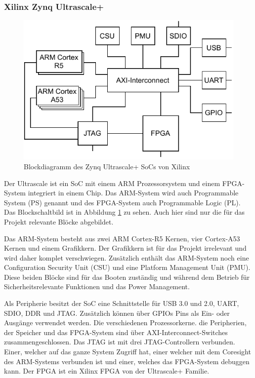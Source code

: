 \documentclass{article}
\begin{document}
\subsubsection*{Xilinx Zynq Ultrascale+}
\begin{figure}[tb]
    \includegraphics[width=\linewidth]{drawio/bd_soc}
    \caption{Blockdiagramm des Zynq Ultrascale+ SoCs von Xilinx}
    \label{fig:bd_soc}
\end{figure}

Der Ultrascale ist ein SoC mit einem ARM Prozessorsystem und einem FPGA-System integriert in einem Chip. Das ARM-System wird auch Programmable System (PS) genannt und des FPGA-System auch Programmable Logic (PL). Das Blockschaltbild ist in Abbildung \ref{fig:bd_soc} zu sehen. Auch hier sind nur die für das Projekt relevante Blöcke abgebildet. 

Das ARM-System besteht aus zwei ARM Cortex-R5 Kernen, vier Cortex-A53 Kernen und einem Grafikkern. Der Grafikkern ist für das Projekt irrelevant und wird daher komplet verschwiegen. Zusätzlich enthält das ARM-System noch eine Configuration Security Unit (CSU) und eine Platform Management Unit (PMU). Diese beiden Blöcke sind für das Booten zuständig und während dem Betrieb für Sicherheitsrelevante Funktionen und das Power Management.

Als Peripherie besitzt der SoC eine Schnittstelle für USB 3.0 und 2.0, UART, SDIO, DDR und JTAG. Zusätzlich können über GPIOs Pins als Ein- oder Ausgänge verwendet werden. Die verschiedenen Prozessorkerne. die Peripherien, der Speicher und das FPGA-System sind über AXI-Interconnect-Switches zusammengeschlossen. Das JTAG ist mit drei JTAG-Controllern verbunden. Einer, welcher auf das ganze System Zugriff hat, einer welcher mit dem Coresight des ARM-Systems verbunden ist und einer, welches das FPGA-System debuggen kann. Der FPGA ist ein Xilinx FPGA von der Ultrascale+ Familie. 
\end{document}
